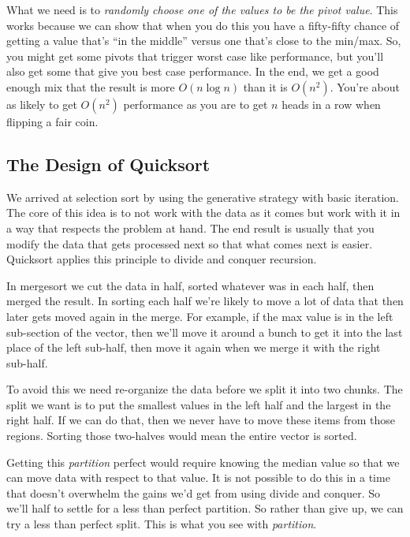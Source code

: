 \documentclass[]{tufte-handout}
\begin{document}
What we need is to \textit{randomly choose one of the values to be the pivot value}. This works because we can show that when you do this you have a fifty-fifty chance of getting a value that's ``in the middle'' versus one that's close to the min/max.  So, you might get some pivots that trigger worst case like performance, but you'll also get some that give you best case performance. In the end, we get a good enough mix that the result is more $O(n \log n)$ than it is $O(n^2)$. You're about as likely to get $O(n^2)$ performance as you are to get $n$ heads in a row when flipping a fair coin. 


\subsection{The Design of Quicksort}

We arrived at selection sort by using the generative strategy with basic iteration.  The core of this idea is to not work with the data as it comes but work with it in a way that respects the problem at hand.  The end result is usually that you modify the data that gets processed next so that what comes next is easier.  Quicksort applies this principle to divide and conquer recursion. 

In mergesort we cut the data in half, sorted whatever was in each half, then merged the result. In sorting each half we're likely to move a lot of data that then later gets moved again in the merge.  For example, if the max value is in the left sub-section of the vector, then we'll move it around a bunch to get it into the last place of the left sub-half, then move it again when we merge it with the right sub-half.  

To avoid this we need re-organize the data before we split it into two chunks. The split we want is to put the smallest values in the left half and the largest in the right half. If we can do that, then we never have to move these items from those regions. Sorting those two-halves would mean the entire vector is sorted. 

Getting this \textit{partition} perfect would require knowing the median value so that we can move data with respect to that value.  It is not possible to do this in a time that doesn't overwhelm the gains we'd get from using divide and conquer. So we'll half to settle for a less than perfect partition. So rather than give up, we can try a less than perfect split. This is what you see with \textit{partition}. 
\end{document}
